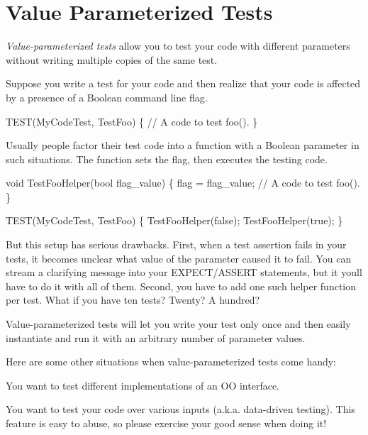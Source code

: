 \section*{Value Parameterized Tests}

{\itshape Value-\/parameterized tests} allow you to test your code with different parameters without writing multiple copies of the same test.

Suppose you write a test for your code and then realize that your code is affected by a presence of a Boolean command line flag.


\begin{DoxyCode}
TEST(MyCodeTest, TestFoo) \{
  // A code to test foo().
\}
\end{DoxyCode}


Usually people factor their test code into a function with a Boolean parameter in such situations. The function sets the flag, then executes the testing code.


\begin{DoxyCode}
void TestFooHelper(bool flag\_value) \{
  flag = flag\_value;
  // A code to test foo().
\}

TEST(MyCodeTest, TestFoo) \{
  TestFooHelper(false);
  TestFooHelper(true);
\}
\end{DoxyCode}


But this setup has serious drawbacks. First, when a test assertion fails in your tests, it becomes unclear what value of the parameter caused it to fail. You can stream a clarifying message into your {\ttfamily E\+X\+P\+E\+CT}/{\ttfamily A\+S\+S\+E\+RT} statements, but it you\textquotesingle{}ll have to do it with all of them. Second, you have to add one such helper function per test. What if you have ten tests? Twenty? A hundred?

Value-\/parameterized tests will let you write your test only once and then easily instantiate and run it with an arbitrary number of parameter values.

Here are some other situations when value-\/parameterized tests come handy\+:


\begin{DoxyItemize}
\item You want to test different implementations of an OO interface.
\item You want to test your code over various inputs (a.\+k.\+a. data-\/driven testing). This feature is easy to abuse, so please exercise your good sense when doing it!
\end{DoxyItemize}

